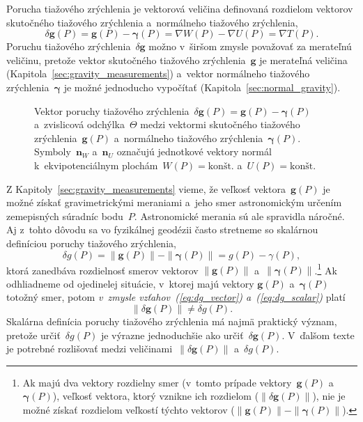 \documentclass[a4paper, 12pt]{book}
\let\vec\mathbf
\begin{document}
Porucha tiažového zrýchlenia je vektorová veličina definovaná rozdielom 
vektorov skutočného tiažového zrýchlenia a~normálneho tiažového zrýchlenia,
%
\begin{equation}
\label{eq:dg_vector}
\delta \vec g(P) = \vec g(P) - \boldsymbol \gamma(P) = \nabla W(P) - \nabla 
U(P) = \nabla T(P){.}
\end{equation}
%
Poruchu tiažového zrýchlenia~$\delta \vec g$ možno v~širšom zmysle považovať za 
merateľnú veličinu, pretože vektor skutočného tiažového zrýchlenia~$\vec g$ je 
merateľná veličina (Kapitola~\ref{sec:gravity_measurements}) a~vektor 
normálneho tiažového zrýchlenia~$\boldsymbol\gamma$ je možné jednoducho 
vypočítať (Kapitola~\ref{sec:normal_gravity}).

\begin{figure}[bt]
\centering

\caption{Vektor poruchy tiažového zrýchlenia~$\delta \vec g(P) = \vec g(P) 
- \boldsymbol\gamma(P)$ a~zvislicová odchýlka~$\Theta$ medzi vektormi 
skutočného tiažového zrýchlenia~$\vec g(P)$ a~normálneho tiažového 
zrýchlenia~$\boldsymbol\gamma(P)$.  Symboly~$\vec n_W$ a~$\vec n_U$ označujú 
jednotkové vektory normál k~ekvipotenciálnym plochám~$W(P) 
= \textrm{kon\v{s}t.}$ a~$U(P) = \textrm{kon\v{s}t.}$}
\label{fig:gravity_disturbance}
\end{figure}

Z Kapitoly~\ref{sec:gravity_measurements} vieme, že veľkosť vektora~$\vec g(P)$ 
je možné získať gravimetrickými meraniami a~jeho smer astronomickým určením 
zemepisných súradníc bodu~$P$.  Astronomické merania sú ale spravidla náročné.  
Aj z~tohto dôvodu sa vo fyzikálnej geodézii často stretneme so skalárnou 
definíciou poruchy tiažového zrýchlenia,
%
\begin{equation}
\label{eq:dg_scalar}
\delta g(P) = \| \vec g(P) \| - \| \boldsymbol \gamma(P) \| = g(P) 
- \gamma(P){,}
\end{equation}
%
ktorá zanedbáva rozdielnosť smerov vektorov $\| \vec g(P) \|$ a~$\| \boldsymbol 
\gamma(P) \|$.\footnote{Ak majú dva vektory rozdielny smer (v~tomto prípade 
vektory~$\vec g(P)$ a~$\boldsymbol \gamma(P)$), veľkosť vektora, ktorý vznikne 
ich rozdielom ($\| \delta \vec g(P) \|$), nie je možné získať rozdielom 
veľkostí týchto vektorov ($\| \vec g(P) \| - \| \boldsymbol \gamma(P) \|$).}  
Ak odhliadneme od ojedinelej situácie, v~ktorej majú vektory $\vec g(P)$ 
a~$\boldsymbol{\gamma}(P)$ totožný smer, potom \emph{v~zmysle 
vzťahov~(\ref{eq:dg_vector}) a~(\ref{eq:dg_scalar})} platí
%
\begin{equation}
\| \delta \vec g(P) \| \neq \delta g(P){.}
\end{equation}
%
Skalárna definícia poruchy tiažového zrýchlenia má najmä praktický význam, 
pretože určiť~$\delta g(P)$ je výrazne jednoduchšie ako určiť~$\delta \vec 
g(P)$.  V~ďalšom texte je potrebné rozlišovať medzi veličinami~$\| \delta \vec 
g(P) \|$ a~$\delta g(P)$.
\end{document}
